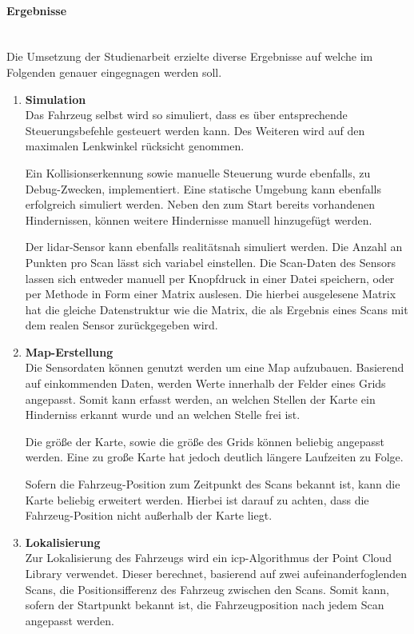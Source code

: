 \paragraph{Ergebnisse} \mbox{}\\
Die Umsetzung der Studienarbeit erzielte diverse Ergebnisse auf welche im Folgenden genauer eingegnagen werden soll.

\begin{enumerate}[leftmargin=*]
    \item \textbf{Simulation} \\
    Das Fahrzeug selbst wird so simuliert, dass es über entsprechende Steuerungsbefehle gesteuert werden kann.
    Des Weiteren wird auf den maximalen Lenkwinkel rücksicht genommen.
    
    Ein Kollisionserkennung sowie manuelle Steuerung wurde ebenfalls, zu Debug-Zwecken, implementiert.
    Eine statische Umgebung kann ebenfalls erfolgreich simuliert werden.
    Neben den zum Start bereits vorhandenen Hindernissen, können weitere Hindernisse manuell hinzugefügt werden.
    
    Der \ac{lidar}-Sensor kann ebenfalls realitätsnah simuliert werden.
    Die Anzahl an Punkten pro Scan lässt sich variabel einstellen.
    Die Scan-Daten des Sensors lassen sich entweder manuell per Knopfdruck in einer Datei speichern, 
    oder per Methode in Form einer Matrix auslesen.
    Die hierbei ausgelesene Matrix hat die gleiche Datenstruktur wie die Matrix, 
    die als Ergebnis eines Scans mit dem realen Sensor zurückgegeben wird.

    \item \textbf{Map-Erstellung} \\
    Die Sensordaten können genutzt werden um eine Map aufzubauen.
    Basierend auf einkommenden Daten, werden Werte innerhalb der Felder eines Grids angepasst.
    Somit kann erfasst werden, an welchen Stellen der Karte ein Hinderniss erkannt wurde und an welchen Stelle frei ist.
    
    Die größe der Karte, sowie die größe des Grids können beliebig angepasst werden.
    Eine zu große Karte hat jedoch deutlich längere Laufzeiten zu Folge.

    Sofern die Fahrzeug-Position zum Zeitpunkt des Scans bekannt ist, kann die Karte beliebig erweitert werden.
    Hierbei ist darauf zu achten, dass die Fahrzeug-Position nicht außerhalb der Karte liegt.

    \item \textbf{Lokalisierung} \\
    Zur Lokalisierung des Fahrzeugs wird ein \ac{icp}-Algorithmus der Point Cloud Library verwendet.
    Dieser berechnet, basierend auf zwei aufeinanderfoglenden Scans, die Positionsifferenz des Fahrzeug zwischen den Scans.
    Somit kann, sofern der Startpunkt bekannt ist, die Fahrzeugposition nach jedem Scan angepasst werden.


\end{enumerate}
